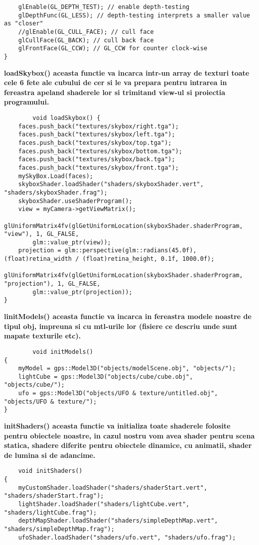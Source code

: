 \begin{itemize}
\begin{verbatim}
	glEnable(GL_DEPTH_TEST); // enable depth-testing
	glDepthFunc(GL_LESS); // depth-testing interprets a smaller value as "closer"
	//glEnable(GL_CULL_FACE); // cull face
	glCullFace(GL_BACK); // cull back face
	glFrontFace(GL_CCW); // GL_CCW for counter clock-wise
}

	\end{verbatim}

	\tab \tab \bf{loadSkybox()} aceasta functie va incarca intr-un array de texturi toate cele 6 fete ale cubului de cer si le va prepara pentru intrarea in fereastra apeland shaderele lor si trimitand view-ul si proiectia programului.\\
	\begin{verbatim}
		void loadSkybox() {
	faces.push_back("textures/skybox/right.tga");
	faces.push_back("textures/skybox/left.tga");
	faces.push_back("textures/skybox/top.tga");
	faces.push_back("textures/skybox/bottom.tga");
	faces.push_back("textures/skybox/back.tga");
	faces.push_back("textures/skybox/front.tga");
	mySkyBox.Load(faces);
	skyboxShader.loadShader("shaders/skyboxShader.vert", "shaders/skyboxShader.frag");
	skyboxShader.useShaderProgram();
	view = myCamera->getViewMatrix();
	glUniformMatrix4fv(glGetUniformLocation(skyboxShader.shaderProgram, "view"), 1, GL_FALSE,
		glm::value_ptr(view));
	projection = glm::perspective(glm::radians(45.0f), (float)retina_width / (float)retina_height, 0.1f, 1000.0f);
	glUniformMatrix4fv(glGetUniformLocation(skyboxShader.shaderProgram, "projection"), 1, GL_FALSE,
		glm::value_ptr(projection));
}
	\end {verbatim}

	\tab \tab \bf{linitModels()} aceasta functie va incarca in fereastra modele noastre de tipul obj, impreuna si cu mtl-urile lor (fisiere ce descriu unde sunt mapate texturile etc).\\
	\begin{verbatim}
		void initModels()
{ 
	myModel = gps::Model3D("objects/modelScene.obj", "objects/");
	lightCube = gps::Model3D("objects/cube/cube.obj", "objects/cube/");
	ufo = gps::Model3D("objects/UFO & texture/untitled.obj", "objects/UFO & texture/");
}
	\end{verbatim}

	\tab \tab \bf{initShaders()} aceasta functie va initializa toate shaderele folosite pentru obiectele noastre, in cazul nostru vom avea shader pentru scena statica, shadere diferite pentru obiectele dinamice, cu animatii, shader de lumina si de adancime.\\
	\begin{verbatim}
	void initShaders()
{
	myCustomShader.loadShader("shaders/shaderStart.vert", "shaders/shaderStart.frag");
	lightShader.loadShader("shaders/lightCube.vert", "shaders/lightCube.frag");
	depthMapShader.loadShader("shaders/simpleDepthMap.vert", "shaders/simpleDepthMap.frag");
	ufoShader.loadShader("shaders/ufo.vert", "shaders/ufo.frag");
	

\end{verbatim}
\end{itemize}
